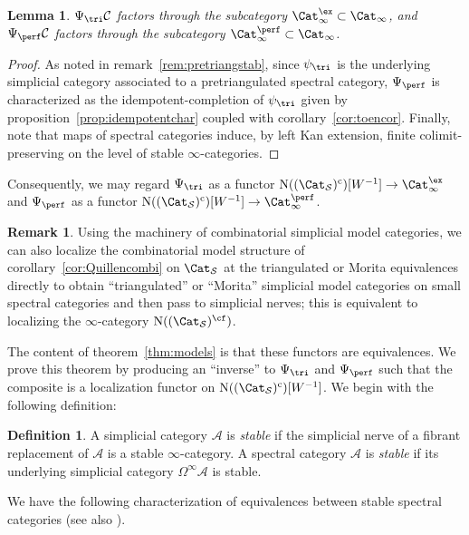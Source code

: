 \documentclass{amsart}
\renewcommand{\to}{\mathchoice{\longrightarrow}{\rightarrow}{\rightarrow}{\rightarrow}}
\let\catsymbfont\mathcal
\newcommand{\aA}{{\catsymbfont{A}}}
\newcommand{\aC}{{\catsymbfont{C}}}
\newcommand{\N}{\mathrm{N}}
\newcommand{\icat}{\Cat_\i}
\newcommand{\stabcat}{\Cat_\i^{\ex}}
\newcommand{\idemstabcat}{\Cat_\i^{\perf}}
\newcommand{\Spcat}{\Cat_\mathcal{S}}%
\renewcommand{\i}{\infty}
\numberwithin{equation}{section}
\newtheorem{lemma}[equation]{Lemma}
\theoremstyle{definition}
\newtheorem{definition}[equation]{Definition}
\newtheorem{remark}[equation]{Remark}
\begin{document}
\begin{lemma}\label{lem:sptostab}
$\Psi_{\tri} \aC$ factors through the subcategory $\stabcat\subset\icat$, and $\Psi_{\perf} \aC$ factors through the subcategory $\idemstabcat\subset\icat$.
\end{lemma}

\begin{proof}
As noted in remark~\ref{rem:pretriangstab}, since $\psi_{\tri}$ is the
underlying simplicial category associated to a pretriangulated
spectral category, $\Psi_{\perf}$ is characterized as the idempotent-completion of $\psi_{\tri}$ given by proposition~\ref{prop:idempotentchar} coupled with
corollary~\ref{cor:toencor}. Finally, note that maps of spectral categories induce, by left Kan extension, finite colimit-preserving on the level of stable $\i$-categories.
\end{proof}

Consequently, we may regard $\Psi_{\tri}$ as a functor $\N((\Spcat)^{\mathrm{c}})[W^{-1}]\to\stabcat$ and $\Psi_{\perf}$ as a functor $\N((\Spcat)^{\mathrm{c}})[W^{-1}]\to\idemstabcat$.

\begin{remark}\label{rem:modelloc}
Using the machinery of combinatorial simplicial model categories, we
can also localize the combinatorial model structure of
corollary~\ref{cor:Quillencombi} on $\Spcat$ at the triangulated or
Morita equivalences directly to obtain ``triangulated'' or ``Morita''
simplicial model categories on small spectral categories and then pass
to simplicial nerves; this is equivalent to localizing the
$\i$-category $\N((\Spcat)^{\cf})$.
\end{remark}

The content of theorem~\ref{thm:models} is that these functors are
equivalences.  We prove this theorem by producing an ``inverse'' to
$\Psi_{\tri}$ and $\Psi_{\perf}$ such that the composite is a
localization functor on $\N((\Spcat)^{\mathrm{c}})[W^{-1}]$.  We begin
with the following definition:

\begin{definition}
A simplicial category $\aA$ is {\em stable} if the simplicial nerve of
a fibrant replacement of $\aA$ is a stable $\i$-category.  A spectral
category $\aA$ is {\em stable} if its underlying simplicial category
$\Omega^\i \aA$ is stable. 
\end{definition}

We have the following characterization of equivalences between stable
spectral categories (see also \cite[5.7]{BM2}).
\end{document}
